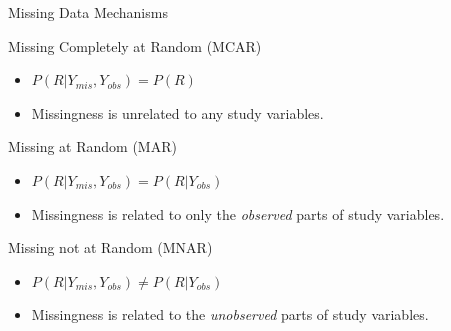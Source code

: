 \documentclass{beamer}\usepackage[]{graphicx}\usepackage[]{color}
\begin{document}
\watermarkon %



\begin{frame}{Missing Data Mechanisms}

  Missing Completely at Random (MCAR)
  \begin{itemize}
  \item $P(R | Y_{mis}, Y_{obs}) = P(R)$
    \vc
  \item Missingness is unrelated to any study variables.
  \end{itemize}
  \vb
  
  Missing at Random (MAR)
  \begin{itemize}
  \item $P(R | Y_{mis}, Y_{obs}) = P(R | Y_{obs})$
    \vc
  \item Missingness is related to only the \emph{observed} parts of study 
      variables.
  \end{itemize}
  \vb
  
  Missing not at Random (MNAR)
  \begin{itemize}
  \item $P(R | Y_{mis}, Y_{obs}) \neq P(R | Y_{obs})$
    \vc
  \item Missingness is related to the \emph{unobserved} parts of study 
    variables.
  \end{itemize}
  
\end{frame}

\watermarkoff %
\end{document}
